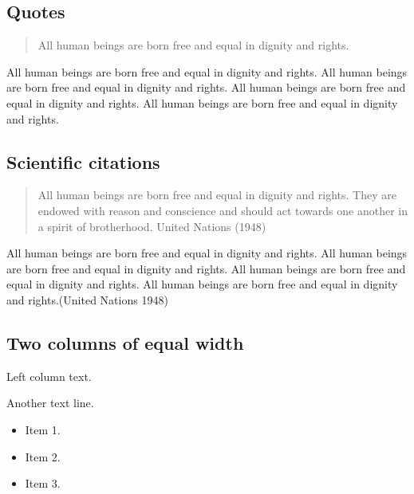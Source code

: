 \documentclass[
]{beamer}
\providecommand{\tightlist}{%
  \setlength{\itemsep}{0pt}\setlength{\parskip}{0pt}}
\begin{document}
\hypertarget{quotes}{%
\subsection{Quotes}\label{quotes}}

\begin{quote}
All human beings are born free and equal in dignity and rights.
\end{quote}

All human beings are born free and equal in dignity and rights. All
human beings are born free and equal in dignity and rights. All human
beings are born free and equal in dignity and rights. All human beings
are born free and equal in dignity and rights.

\hypertarget{scientific-citations}{%
\subsection{Scientific citations}\label{scientific-citations}}

\begin{otherlanguage}{english}

\begin{quote}
All human beings are born free and equal in dignity and rights. They are
endowed with reason and conscience and should act towards one another in
a spirit of brotherhood. United Nations (1948)
\end{quote}

\end{otherlanguage}

All human beings are born free and equal in dignity and rights. All
human beings are born free and equal in dignity and rights. All human
beings are born free and equal in dignity and rights. All human beings
are born free and equal in dignity and rights.(United Nations 1948)

\hypertarget{two-columns-of-equal-width}{%
\subsection{Two columns of equal
width}\label{two-columns-of-equal-width}}

Left column text.

Another text line.

\begin{itemize}
\tightlist
\item
  Item 1.
\item
  Item 2.
\item
  Item 3.
\end{itemize}
\end{document}
